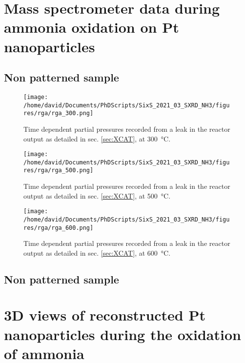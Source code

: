 \section{Mass spectrometer data during ammonia oxidation on Pt nanoparticles}

\subsection{Non patterned sample} \label{sec:RGANanoparticlesNonPatterned}

\begin{figure}[!htb]
    \centering
    \texttt{[image: /home/david/Documents/PhDScripts/SixS\_2021\_03\_SXRD\_NH3/figures/rga/rga\_300.png]}
    \caption{
        Time dependent partial pressures recorded from a leak in the reactor output as detailed in sec. \ref{sec:XCAT}, at \qty{300}{\degreeCelsius}.
    }
    \label{fig:RGA300SXRDNanoparticles}
\end{figure}

\begin{figure}[!htb]
    \centering
    \texttt{[image: /home/david/Documents/PhDScripts/SixS\_2021\_03\_SXRD\_NH3/figures/rga/rga\_500.png]}
    \caption{
        Time dependent partial pressures recorded from a leak in the reactor output as detailed in sec. \ref{sec:XCAT}, at \qty{500}{\degreeCelsius}.
    }
    \label{fig:RGA500SXRDNanoparticles}
\end{figure}

\begin{figure}[!htb]
    \centering
    \texttt{[image: /home/david/Documents/PhDScripts/SixS\_2021\_03\_SXRD\_NH3/figures/rga/rga\_600.png]}
    \caption{
        Time dependent partial pressures recorded from a leak in the reactor output as detailed in sec. \ref{sec:XCAT}, at \qty{600}{\degreeCelsius}.
    }
    \label{fig:RGA600SXRDNanoparticles}
\end{figure}

\subsection{Non patterned sample} \label{sec:RGANanoparticlesPatterned}

\section{3D views of reconstructed Pt nanoparticles during the oxidation of ammonia}\label{sec:3DAmmoniaOxidation}


